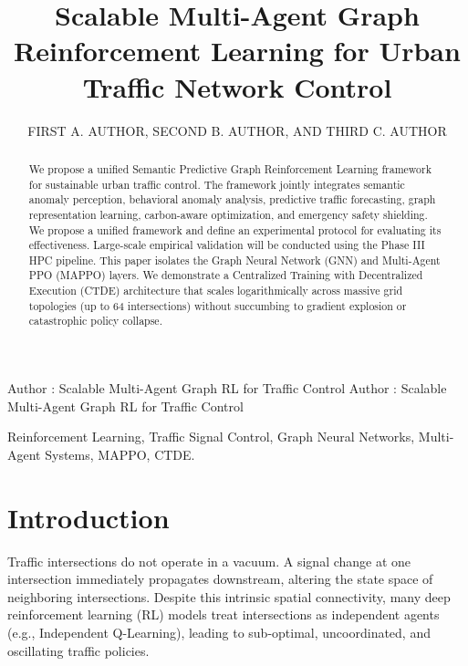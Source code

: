 \documentclass{ieeeaccess}
\begin{document}

\title{Scalable Multi-Agent Graph Reinforcement Learning for Urban Traffic Network Control}
\author{\uppercase{First A. Author},
\uppercase{Second B. Author, and Third C. Author}}
\address[1]{Department of Computer Science, University of Technology, City, Country}

\markboth
{Author \headeretal: Scalable Multi-Agent Graph RL for Traffic Control}
{Author \headeretal: Scalable Multi-Agent Graph RL for Traffic Control}


\begin{abstract}
We propose a unified Semantic Predictive Graph Reinforcement Learning framework for sustainable urban traffic control. The framework jointly integrates semantic anomaly perception, behavioral anomaly analysis, predictive traffic forecasting, graph representation learning, carbon-aware optimization, and emergency safety shielding. We propose a unified framework and define an experimental protocol for evaluating its effectiveness. Large-scale empirical validation will be conducted using the Phase III HPC pipeline. This paper isolates the Graph Neural Network (GNN) and Multi-Agent PPO (MAPPO) layers. We demonstrate a Centralized Training with Decentralized Execution (CTDE) architecture that scales logarithmically across massive grid topologies (up to 64 intersections) without succumbing to gradient explosion or catastrophic policy collapse.
\end{abstract}

\begin{keywords}
Reinforcement Learning, Traffic Signal Control, Graph Neural Networks, Multi-Agent Systems, MAPPO, CTDE.
\end{keywords}

\titlepgskip=-15pt
\maketitle

\section{Introduction}
\label{sec:introduction}
Traffic intersections do not operate in a vacuum. A signal change at one intersection immediately propagates downstream, altering the state space of neighboring intersections. Despite this intrinsic spatial connectivity, many deep reinforcement learning (RL) models treat intersections as independent agents (e.g., Independent Q-Learning), leading to sub-optimal, uncoordinated, and oscillating traffic policies.
\end{document}
